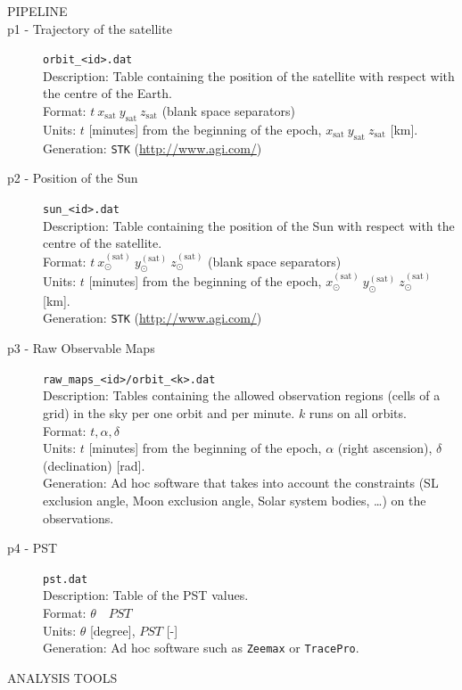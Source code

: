 \documentclass[a4paper,10pt]{article}
\newcommand{\httplink}[1]{{\href{#1}{#1}}}
\begin{document}
\begin{description}
\item [PIPELINE]
 \item [p1 - Trajectory of the satellite] \verb=orbit_<id>.dat=
 	\\ Description: Table containing the position of the satellite with respect with the centre of the Earth.
	\\ Format: $t\ x_\text{sat}\ y_\text{sat}\ z_\text{sat}$ (blank space separators)
	\\ Units: $t$ [minutes] from the beginning of the epoch, $x_\text{sat}\ y_\text{sat}\ z_\text{sat}$ [km].
	\\ Generation: \verb=STK= (\httplink{http://www.agi.com/})
 \item [p2 - Position of the Sun] \verb=sun_<id>.dat=
 	\\ Description: Table containing the position of the Sun with respect with the centre of the satellite.
	\\ Format: $t\ x_\odot^{(\text{sat})}\ y_\odot^{(\text{sat})}\ z_\odot^{(\text{sat})}$ (blank space separators)
	\\ Units: $t$ [minutes] from the beginning of the epoch, $x_\odot^{(\text{sat})}\ y_\odot^{(\text{sat})}\ z_\odot^{(\text{sat})}$ [km].
	\\ Generation: \verb=STK= (\httplink{http://www.agi.com/})
 \item [p3 - Raw Observable Maps] \verb=raw_maps_<id>/orbit_<k>.dat=
 	\\ Description: Tables containing the allowed observation regions (cells of a grid) in the sky per one orbit and per minute. $k$ runs on all orbits.
	\\ Format: $t,\alpha,\delta$
	\\ Units: $t$ [minutes] from the beginning of the epoch, $\alpha$ (right ascension), $\delta$ (declination) [rad].
	\\ Generation: Ad hoc software that takes into account the constraints (SL exclusion angle, Moon exclusion angle, Solar system bodies, \dots) on the observations.
\item [p4 - PST] \verb=pst.dat=
 	\\ Description: Table of the PST values.
	\\ Format: $\theta\quad PST$
	\\ Units: $\theta$ [degree], $PST$ [-]
	\\ Generation: Ad hoc software such as \verb=Zeemax= or \verb=TracePro=.
\item [ANALYSIS TOOLS]

\end{description}
\end{document}
